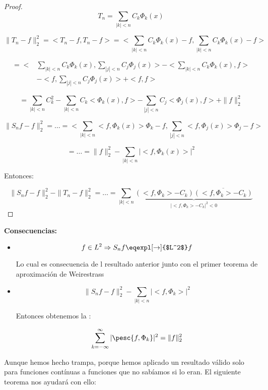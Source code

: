 			\begin{proof}

				\[ T_n = \sum_{|k| < n} C_k \Phi_k(x) \]

				\[ \| T_n - f \|_{2}^2 = < T_n -f, T_n - f> = < \sum_{|k| < n} C_k \Phi_k(x) - f, \sum_{|k| < n} C_k \Phi_k(x) - f >   \]

				\begin{align*} = < &\sum_{|k| < n} C_k \Phi_k(x), \sum_{|j| < n} C_j \Phi_j(x) > - < \sum_{|k| < n} C_k \Phi_k(x), f> \\ &- <f, \sum_{|j| < n} C_j \Phi_j(x)> + <f,f> \end{align*}

				\[ = \sum_{|k| < n} C_k^2 - \sum_{|k| < n} C_k <\Phi_k(x),f> - \sum_{|j| < n} C_j <\Phi_j(x),f> + \|f\|_2^2  \]


				\[ \| S_n f - f \|_2^2 = … = < \sum_{|k| < n} <f,\Phi_k(x)> \Phi_k -f,  \sum_{|j| < n} <f,\Phi_j(x)> \Phi_j -f>\]

				\[ = … = \|f\|_2^2 - \sum_{|k| < n} |<f,\Phi_k(x)>|^2 \]

				Entonces:

				\[ \| S_n f - f \|_2^2 - \|T_n -f\|_2^2 = … = \sum_{|k| < n} \underbrace{(<f,\Phi_k> - C_k) \overline{(<f,\Phi_k> - C_k)}}_{|<f, \Phi_k> - C_k|^2 < 0}  \]


			\end{proof}

		\textbf{Consecuencias:}

		\begin{itemize}

			\item  \[ f \in L^2 \Rightarrow S_n f \eqexpl[\rightarrow]{$L^2$} f \]

			Lo cual es consecuencia de l resultado anterior junto con el primer teorema de aproximación de Weirestrass

			\item \[ \| S_n f - f \|_{2}^2 - \sum_{|k|<n} | <f, \Phi_k> |^2  \]

			Entonces obtenemos la :

			\[ \sum_{k= -\infty}^\infty  |\pesc{f, \Phi_k}|^2 = \|f\|^2_2 \]


		\end{itemize}




		Aunque hemos hecho trampa, porque hemos aplicado un resultado válido solo para funciones contínuas a funciones que no sabíamos si lo eran. El siguiente teorema nos ayudará con ello:

